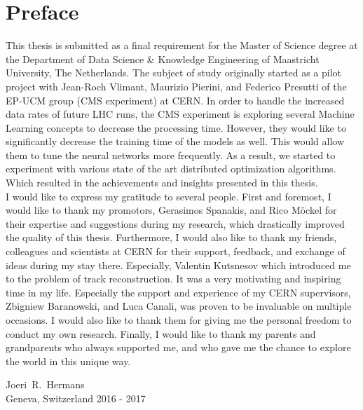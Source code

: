 %
%
%

\newpage
\chapter*{Preface}

This thesis is submitted as a final requirement for the Master of Science degree at the Department of Data Science \& Knowledge Engineering of Maastricht University, The Netherlands. The subject of study originally started as a pilot project with Jean-Roch Vlimant, Maurizio Pierini, and Federico Presutti of the EP-UCM group (CMS experiment) at CERN. In order to handle the increased data rates of future LHC runs, the CMS experiment is exploring several Machine Learning concepts to decrease the processing time. However, they would like to significantly decrease the training time of the models as well. This would allow them to tune the neural networks more frequently. As a result, we started to experiment with various state of the art distributed optimization algorithms. Which resulted in the achievements and insights presented in this thesis.\\

I would like to express my gratitude to several people. First and foremost, I would like to thank my promotors, Gerasimos Spanakis, and Rico M\"ockel for their expertise and suggestions during my research, which drastically improved the quality of this thesis. Furthermore, I would also like to thank my friends, colleagues and scientists at CERN for their support, feedback, and exchange of ideas during my stay there. Especially, Valentin Kutsnesov which introduced me to the problem of track reconstruction. It was a very motivating and inspiring time in my life. Especially the support and experience of my CERN supervisors, Zbigniew Baranowski, and Luca Canali, was proven to be invaluable on multiple occasions. I would also like to thank them for giving me the personal freedom to conduct my own research. Finally, I would like to thank my parents and grandparents who always supported me, and who gave me the chance to explore the world in this unique way.

\vspace{1cm}
\begin{flushright}
Joeri~R.~Hermans\\
Geneva, Switzerland 2016 - 2017
\end{flushright}
